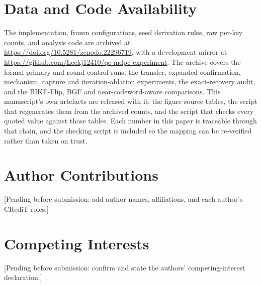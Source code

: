 \documentclass[lettersize,journal]{IEEEtran}
\begin{document}
\section*{Data and Code Availability}
The implementation, frozen configurations, seed derivation rules, raw per-key counts, and analysis code are archived at \url{https://doi.org/10.5281/zenodo.22296719}, with a development mirror at \url{https://github.com/Leekj12410/qc-mdpc-experiment}. The archive covers the formal primary and round-control runs, the transfer, expanded-confirmation, mechanism, capture and iteration-ablation experiments, the exact-recovery audit, and the BIKE-Flip, BGF and near-codeword-aware comparisons. This manuscript's own artefacts are released with it: the figure source tables, the script that regenerates them from the archived counts, and the script that checks every quoted value against those tables. Each number in this paper is traceable through that chain, and the checking script is included so the mapping can be re-verified rather than taken on trust.

\section*{Author Contributions}
[Pending before submission: add author names, affiliations, and each author's CRediT roles.]

\section*{Competing Interests}
[Pending before submission: confirm and state the authors' competing-interest declaration.]



\end{document}
